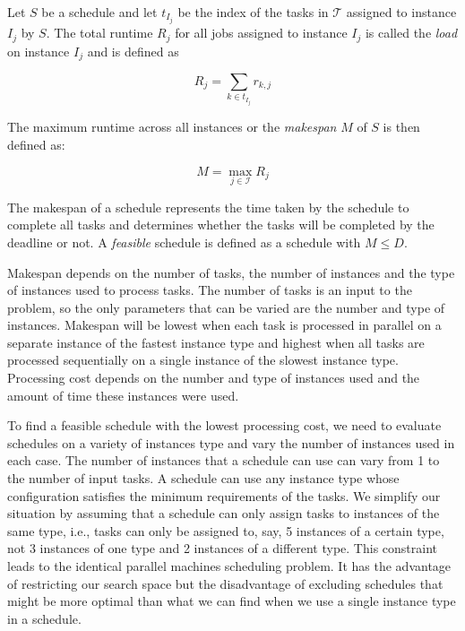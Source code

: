 \documentclass[12pt]{report}
\begin{document}
Let $S$ be a schedule and let $t_{I_j}$ be the index of the tasks in $\mathcal{T}$ assigned to instance $I_j$ by $S$.
The total runtime $R_j$ for all jobs assigned to instance $I_j$ is called the  \textit{load} on instance $I_j$ and is defined as

\begin{equation}
\label{eq:def:load}
R_j = \sum_{k \in t_{I_j}} r_{k,j}
\end{equation}

The maximum runtime across all instances or the \textit{makespan} $M$ of $S$ is then defined as:

\begin{equation}
\label{eq:def:makespan}
M = \max_{j \in \mathcal{I}} {R_j}
\end{equation}

The makespan of a schedule represents the time taken by the schedule to complete all tasks and determines whether the tasks will be completed by the deadline or not.
A \textit{feasible} schedule is defined as a schedule with $M \le D$.

Makespan depends on the number of tasks, the number of instances and the type of instances used to process tasks.
The number of tasks is an input to the problem, so the only parameters that can be varied are the number and type of instances.
Makespan will be lowest when each task is processed in parallel on a separate instance of the fastest instance type and highest when all tasks are processed sequentially on a single instance of the slowest instance type.
Processing cost depends on the number and type of instances used and the amount of time these instances were used.

To find a feasible schedule with the lowest processing cost, we need to evaluate schedules on a variety of instances type and vary the number of instances used in each case.
The number of instances that a schedule can use can vary from 1 to the number of input tasks.
A schedule can use any instance type whose configuration satisfies the minimum requirements of the tasks.
We simplify our situation by assuming that a schedule can only assign tasks to instances of the same type, i.e., tasks can only be assigned to, say, 5 instances of a certain type, not 3 instances of one type and 2 instances of a different type.
This constraint leads to the identical parallel machines scheduling problem.
It has the advantage of restricting our search space but the disadvantage of excluding schedules that might be more optimal than what we can find when we use a single instance type in a schedule.
\end{document}
